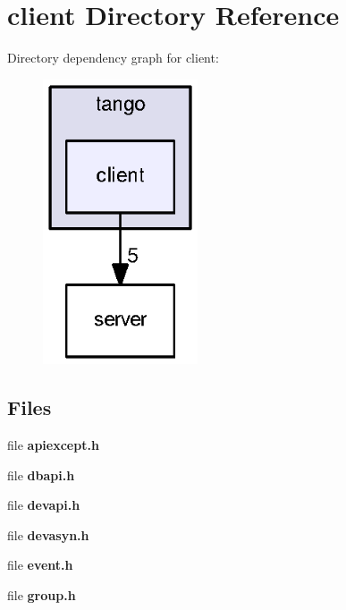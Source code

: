 \section{client Directory Reference}
\label{dir_2c97772c37e69a4932bdc5785a2398fe}
Directory dependency graph for client\-:
\nopagebreak
\begin{figure}[H]
\begin{center}
\leavevmode
\includegraphics[width=130pt]{dir_2c97772c37e69a4932bdc5785a2398fe_dep}
\end{center}
\end{figure}
\subsection*{Files}
\begin{DoxyCompactItemize}
\item 
file {\bf apiexcept.\-h}
\item 
file {\bf dbapi.\-h}
\item 
file {\bf devapi.\-h}
\item 
file {\bf devasyn.\-h}
\item 
file {\bf event.\-h}
\item 
file {\bf group.\-h}
\end{DoxyCompactItemize}
